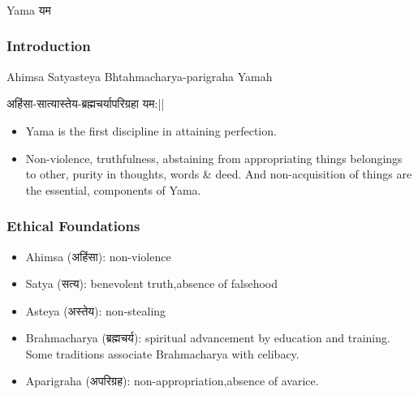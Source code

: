 \begin{frame}[fragile]\frametitle{}
\begin{center}
{\Large Yama यम}
\end{center}
\end{frame}

\begin{frame}[fragile]\frametitle{Introduction}

Ahimsa Satyasteya Bhtahmacharya-parigraha Yamah

अहिंसा-सात्यास्तेय-ब्रह्मचर्यापरिग्रहा यम:||

	\begin{itemize}
	\item Yama  is 
the  first  discipline  in  attaining 
perfection.
	\item Non-violence,  truthfulness, abstaining  from  appropriating things  belongings  to  other, 
purity  in  thoughts,  words  \& 
deed.  And  non-acquisition  of 
things  are  the  essential, 
components of Yama. 
	\end{itemize}

\end{frame}


\begin{frame}[fragile]\frametitle{Ethical Foundations}

	\begin{itemize}
	\item Ahimsa (अहिंसा): non-violence
	\item Satya (सत्य): benevolent truth,absence of falsehood
	\item Asteya (अस्तेय): non-stealing
	\item Brahmacharya (ब्रह्मचर्य): spiritual advancement by education and training. Some traditions associate Brahmacharya with celibacy.
	\item Aparigraha (अपरिग्रह): non-appropriation,absence of avarice.

	\end{itemize}

\end{frame}


